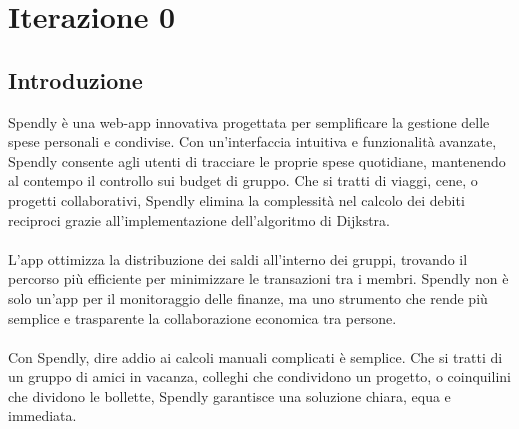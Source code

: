 \chapter{Iterazione 0}
\section{Introduzione}
Spendly è una web-app innovativa progettata per semplificare la gestione delle spese personali e condivise. Con un’interfaccia intuitiva e funzionalità avanzate, Spendly consente agli utenti di tracciare le proprie spese quotidiane, mantenendo al contempo il controllo sui budget di gruppo. Che si tratti di viaggi, cene, o progetti collaborativi, Spendly elimina la complessità nel calcolo dei debiti reciproci grazie all'implementazione dell'algoritmo di Dijkstra.
\\
\\
L'app ottimizza la distribuzione dei saldi all'interno dei gruppi, trovando il percorso più efficiente per minimizzare le transazioni tra i membri. Spendly non è solo un’app per il monitoraggio delle finanze, ma uno strumento che rende più semplice e trasparente la collaborazione economica tra persone.
\\
\\
Con Spendly, dire addio ai calcoli manuali complicati è semplice. Che si tratti di un gruppo di amici in vacanza, colleghi che condividono un progetto, o coinquilini che dividono le bollette, Spendly garantisce una soluzione chiara, equa e immediata.
\\
